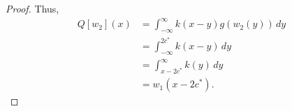 \documentclass[11pt]{article}
\theoremstyle{definition}
\numberwithin{equation}{section}
\numberwithin{thm}{section}
\renewcommand{\a}{a}
\renewcommand{\b}{b}
\newcommand{\m}{n_1}
\begin{document}
\begin{proof}
%

Thus,
\begin{equation} \begin{aligned}
Q[w_2](x) &= \int_{-\infty}^{\infty} k(x-y) g(w_2(y)) \, dy \\
&= \int_{-\infty}^{2c^*} k(x-y) \, dy \\
&= \int_{x-2c^*}^{\infty} k(y) \, dy \\
&= w_1(x-2c^*).
\end{aligned} \end{equation}
\end{proof}
\end{document}
